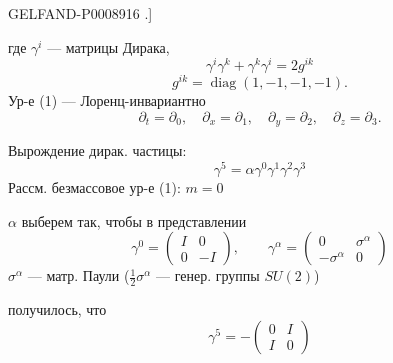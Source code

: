 \begin{GelfandAdjacentEvidence}{GELFAND-P000891}{6}
.]

где $\gamma^i$ — матрицы Дирака,
\begin{equation*}
\gamma^i\gamma^k+\gamma^k\gamma^i=2g^{ik} \tag{3}
\end{equation*}
\begin{equation*}
g^{ik}=\operatorname{diag}(1,-1,-1,-1). \tag{4}
\end{equation*}
Ур-е (1) — Лоренц-инвариантно
\[
\partial_t=\partial_0,\quad \partial_x=\partial_1,\quad
\partial_y=\partial_2,\quad \partial_z=\partial_3.
\]

Вырождение дирак. частицы:
\begin{equation*}
\gamma^5=\alpha\gamma^0\gamma^1\gamma^2\gamma^3 \tag{5}
\end{equation*}
Рассм. безмассовое ур-е (1): $m=0$

$\alpha$ выберем так, чтобы в представлении
\begin{equation*}
\gamma^0=\begin{pmatrix}I&0\\0&-I\end{pmatrix},\qquad
\gamma^\alpha=\begin{pmatrix}0&\sigma^\alpha\\-\sigma^\alpha&0\end{pmatrix} \tag{6}
\end{equation*}
$\sigma^\alpha$ — матр. Паули ($\frac12\sigma^\alpha$ — генер. группы $SU(2)$)

получилось, что
\begin{equation*}
\gamma^5=-\begin{pmatrix}0&I\\I&0\end{pmatrix} \tag{7}
\end{equation*}

\end{GelfandAdjacentEvidence}



